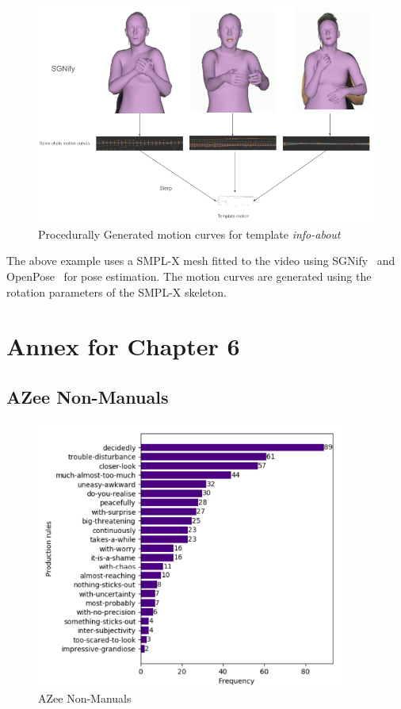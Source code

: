 \documentclass[../main.tex]{subfiles}
\begin{document}
\begin{figure}
    \centering \includegraphics[width = 5in]{chapters/intermediate_blocks_pose_correction/images/motion_curves_template_procedural_pose_est.png}
    \caption{Procedurally Generated motion curves for template \emph{info-about}}
    \label{fig:motion_curves_template_procedural_pose_est}
\end{figure}

The above example uses a SMPL-X mesh fitted to the video using SGNify~\cite{SGNify} and OpenPose~\cite{cao2018openpose} for pose estimation. The motion curves are generated using the rotation parameters of the SMPL-X skeleton.

\section{Annex for Chapter 6}
\label{annex:facial_expressions}

\subsection{AZee Non-Manuals}
\label{annex:facial_expressions:azee_non_manuals}

\begin{figure}[h]
    \centering
    \includegraphics[width=4in]{chapters/facial_expressions/images/azee_non_manuals.png}
    \caption{AZee Non-Manuals}
    \label{fig:azee_non_manuals}
\end{figure}
\end{document}
